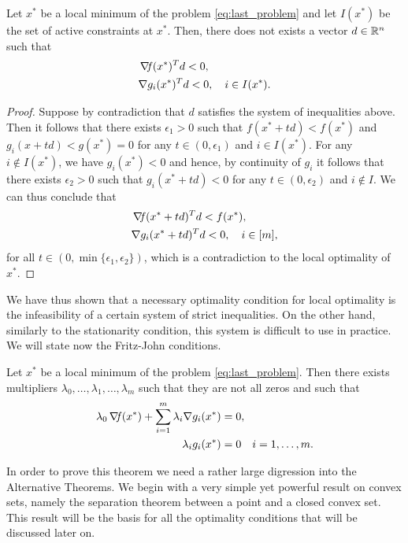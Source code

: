 \documentclass[10pt,a4paper]{article}
\begin{document}
\begin{lemma}
Let $x^*$ be a local minimum of the problem \eqref{eq:last_problem} and let $I(x^*)$ be the set of active constraints at $x^*$. Then, there does not exists a vector $d\in\mathbb{R}^n$ such that 
\begin{align*}
&\operatorname*{\mathit{\nabla \!f}}(x^*)^Td<0,\\
&\nabla g_i (x^*)^Td<0,\quad i \in I(x^*).
\end{align*}
\end{lemma}
\begin{proof}
Suppose by contradiction that $d$ satisfies the system of inequalities above. Then it follows that there exists $\epsilon_1>0$ such that $f(x^*+td)<f(x^*)$ and $g_i(x+td)<g(x^*)=0$ for any $t\in (0,\epsilon_1)$ and $i\in I(x^*)$. For any $i\not \in I(x^*)$, we have $g_i(x^*)<0$ and hence, by continuity of $g_i$ it follows that there exists $\epsilon_2>0$ such that $g_i(x^*+td)<0$ for any $t\in (0,\epsilon_2)$ and $i\not \in I$. We can thus conclude that 
\begin{align*}
&\operatorname*{\mathit{\nabla \!f}}(x^*+td)^Td<f(x^*),\\
&\nabla g_i (x^*+td)^Td<0,\quad i \in [m],
\end{align*}
for all $t\in (0,\min\{\epsilon_1,\epsilon_2\})$, which is a contradiction to the local optimality of $x^*$.
\end{proof}
We have thus shown that a necessary optimality condition for local optimality is the infeasibility of a certain system of strict inequalities. On the other hand, similarly to the stationarity condition, this system is difficult to use in practice. We will state now the Fritz-John conditions.
\begin{theorem}
Let $x^*$ be a local minimum of the problem \eqref{eq:last_problem}. Then there exists multipliers $\lambda_0,\dots, \lambda_1, \dots, \lambda_m$ such that they are not all zeros and such that 
\begin{equation}\label{eq:fritzjohn}
\begin{split}
\lambda_0\operatorname*{\mathit{\nabla \!f}}(x^*)+ \sum_{i=1}^{m} \lambda_i \nabla g_i(x^*) &= 0,\\
\lambda_ig_i(x^*)&=0 \quad i=1, \dots, m.
\end{split}
\end{equation}
\end{theorem}
\noindent In order to prove this theorem we need a rather large digression into the Alternative Theorems. We begin with a very simple yet powerful result on convex sets, namely the separation theorem between a point and a closed convex set. This result will be the basis for all the optimality conditions that will be discussed later on.
\begin{theorem}
	
\end{theorem}


\end{document}

